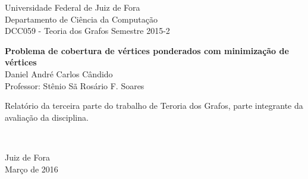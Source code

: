 \vspace*{-2cm}
{\bf
\begin{center}
  {\large
  \hspace*{0cm}Universidade Federal de Juiz de Fora} \\
  \hspace*{0cm}Departamento de Ciência da Computação \\
  \hspace*{0cm}DCC059 - Teoria dos Grafos Semestre 2015-2  \\
\end{center}}
\vspace{4.0cm}
\begin{center}
  {\Large \bf Problema de cobertura de vértices ponderados com minimização de vértices } \\[4cm]
  {\Large Daniel André Carlos Cândido}\\[6mm]
  {\Large Professor: Stênio Sã Rosário F. Soares}\\[3.0cm]
\end{center}

{\raggedleft
\begin{minipage}[t]{8.3cm}
  \setlength{\baselineskip}{0.25in}
  Relatório da terceira parte do  trabalho de Teroria dos Grafos, parte integrante da avaliação da disciplina.
\end{minipage}\\[1cm]}

\vspace{4cm}
{\center Juiz de Fora \\[1mm]
Março de 2016 \\}

\newpage
